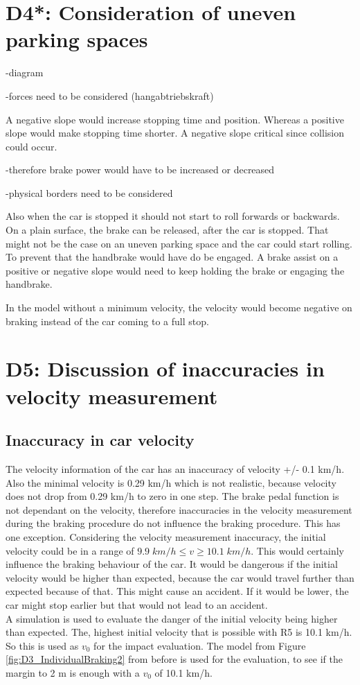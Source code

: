 \chapter{D4*: Consideration of uneven parking spaces}\label{cha:D4}

-diagram

-forces need to be considered (hangabtriebskraft)

A negative slope would increase stopping time and position. Whereas a positive slope would make stopping time shorter.
A negative slope critical since collision could occur.


-therefore brake power would have to be increased or decreased

-physical borders need to be considered

Also when the car is stopped it should not start to roll forwards or backwards.
On a plain surface, the brake can be released, after the car is stopped. That might not be the case on an uneven parking space and the car could start rolling. To prevent that the handbrake would have do be engaged.
A brake assist on a positive or negative slope would need to keep holding the brake or engaging the handbrake.

In the model without a minimum velocity, the velocity would become negative on braking instead of the car coming to a full stop.

\chapter{D5: Discussion of inaccuracies in velocity measurement}\label{cha:D5}
\section{Inaccuracy in car velocity}

The velocity information of the car has an inaccuracy of velocity +/- 0.1 km/h.
Also the minimal velocity is 0.29 km/h which is not realistic, because velocity does not drop from 0.29 km/h to zero in one step.
The brake pedal function is not dependant on the velocity, therefore inaccuracies in the velocity measurement during the braking procedure do not influence the braking procedure.
This has one exception.
Considering the velocity measurement inaccuracy, the initial velocity could be in a range of $9.9\; km/h \leq v  \geq 10.1\; km/h$.
This would certainly influence the braking behaviour of the car.
It would be dangerous if the initial velocity would be higher than expected, because the car would travel further than expected because of that.
This might cause an accident.
If it would be lower, the car might stop earlier but that would not lead to an accident.\\
A simulation is used to evaluate the danger of the initial velocity being higher than expected.
The, highest initial velocity that is possible with R5 is 10.1 km/h.
So this is used as $v_0$ for the impact evaluation.
The model from Figure \ref{fig:D3_IndividualBraking2} from before is used for the evaluation, to see if the margin to 2 m is enough with a $v_0$ of 10.1 km/h.\\

